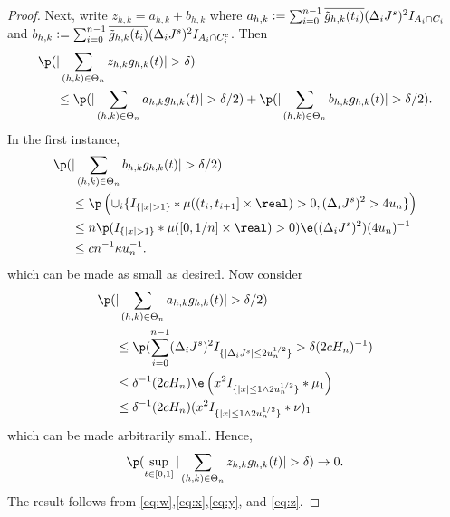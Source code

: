 \begin{proof}
Next,  write $z_{h,k} = a_{h,k} + b_{h,k}$ where $a_{h,k} :=  \sum_{i = 0}^{n-1} \overline{\tilde{g}_{h,k}(t_i)}(\Delta_i J^s)^2I_{A_i \cap C_i}$ and  $b_{h,k} := \sum_{i = 0}^{n-1} \overline{\tilde{g}_{h,k}(t_i)}(\Delta_i J^s)^2I_{A_i \cap C_i^c}$. Then 
\begin{align}
  \p(&\vert \sumt z_{h,k} \ghk(t) \vert   > \delta) \notag \\ &\le \p(\vert \sumt a_{h,k} \ghk(t) \vert > \delta/2) + \p(\vert \sumt b_{h,k} \ghk(t) \vert > \delta/2)\notag.
\end{align}
In the first instance,
\begin{align}
  \p(&\vert \sumt b_{h,k} \ghk(t) \vert > \delta/2) \notag \\ &\le
\p\left(\cup_i\{I_{\{\vert x \vert > 1\}}\ast \mu( (t_i, t_{i + 1}] \times \real) > 0   , (\djt)^2 > 4u_n\}\right) \notag \\
&\le n \p(I_{\{\vert x \vert > 1\}}\ast \mu( [0, 1/n] \times \real) > 0) \e((\djt)^2)(4u_n)^{-1}\notag \\
&\le cn^{-1}\kappa  u^{-1}_n.
\end{align}
which can be made as small as desired. Now consider
\begin{align}
  \p(&\vert \sumt a_{h,k} \ghk(t) \vert > \delta/2) \notag \\ &\le \p( \sumin (\djt)^2 I_{\{\vert \djt \vert \le 2u_n^{1/2} \}} > \delta (2 c H_n)^{-1} )\notag\\
  &\le\delta^{-1} (2 c H_n)\e\left( x^2I_{\{\vert x\vert \le 1 \wedge 2 u_n^{1/2}\}}\ast\mu_1  \right)\notag \\
  &\le \delta^{-1} (2 c H_n) (x^2I_{\{\vert x\vert \le 1 \wedge 2 u_n^{1/2}\}}\ast\nu)_1
\notag
  \label{}
\end{align}
which can be made arbitrarily small.
Hence, 
\begin{align}
  \p(\sup_{t \in [0,1]}\vert \sumt z_{h,k} \ghk(t) \vert > \delta) \to 0.\label{eq:z}
\end{align}
The result follows from \eqref{eq:w},\eqref{eq:x},\eqref{eq:y}, and \eqref{eq:z}.
\end{proof}

